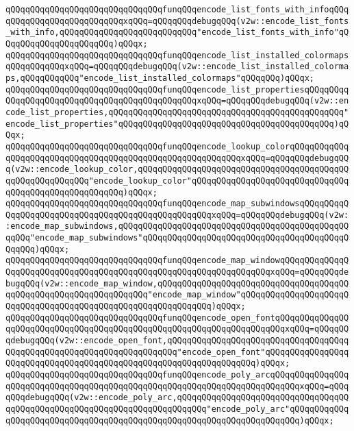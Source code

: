 \verb|qQQqqQQqqQQqqQQqqQQqqQQqqQQqqQQqfunqQQqencode_list_fonts_with_infoqQQqqQQqqQQqqQQqqQQqqQQqqQQqxqQQq=qQQqqQQqdebugqQQq(v2w::encode_list_fonts_with_info,qQQqqQQqqQQqqQQqqQQqqQQqqQQq"encode_list_fonts_with_info"qQQqqQQqqQQqqQQqqQQqqQQq)qQQqx;|\newline
\verb|qQQqqQQqqQQqqQQqqQQqqQQqqQQqqQQqfunqQQqencode_list_installed_colormapsqQQqqQQqqQQqxqQQq=qQQqqQQqdebugqQQq(v2w::encode_list_installed_colormaps,qQQqqQQqqQQq"encode_list_installed_colormaps"qQQqqQQq)qQQqx;|\newline
\verb|qQQqqQQqqQQqqQQqqQQqqQQqqQQqqQQqfunqQQqencode_list_propertiesqQQqqQQqqQQqqQQqqQQqqQQqqQQqqQQqqQQqqQQqqQQqqQQqxqQQq=qQQqqQQqdebugqQQq(v2w::encode_list_properties,qQQqqQQqqQQqqQQqqQQqqQQqqQQqqQQqqQQqqQQqqQQqqQQq"encode_list_properties"qQQqqQQqqQQqqQQqqQQqqQQqqQQqqQQqqQQqqQQqqQQq)qQQqx;|\newline
\verb|qQQqqQQqqQQqqQQqqQQqqQQqqQQqqQQqfunqQQqencode_lookup_colorqQQqqQQqqQQqqQQqqQQqqQQqqQQqqQQqqQQqqQQqqQQqqQQqqQQqqQQqqQQqxqQQq=qQQqqQQqdebugqQQq(v2w::encode_lookup_color,qQQqqQQqqQQqqQQqqQQqqQQqqQQqqQQqqQQqqQQqqQQqqQQqqQQqqQQqqQQq"encode_lookup_color"qQQqqQQqqQQqqQQqqQQqqQQqqQQqqQQqqQQqqQQqqQQqqQQqqQQqqQQq)qQQqx;|\newline
\verb|qQQqqQQqqQQqqQQqqQQqqQQqqQQqqQQqfunqQQqencode_map_subwindowsqQQqqQQqqQQqqQQqqQQqqQQqqQQqqQQqqQQqqQQqqQQqqQQqqQQqxqQQq=qQQqqQQqdebugqQQq(v2w::encode_map_subwindows,qQQqqQQqqQQqqQQqqQQqqQQqqQQqqQQqqQQqqQQqqQQqqQQqqQQq"encode_map_subwindows"qQQqqQQqqQQqqQQqqQQqqQQqqQQqqQQqqQQqqQQqqQQqqQQq)qQQqx;|\newline
\verb|qQQqqQQqqQQqqQQqqQQqqQQqqQQqqQQqfunqQQqencode_map_windowqQQqqQQqqQQqqQQqqQQqqQQqqQQqqQQqqQQqqQQqqQQqqQQqqQQqqQQqqQQqqQQqqQQqxqQQq=qQQqqQQqdebugqQQq(v2w::encode_map_window,qQQqqQQqqQQqqQQqqQQqqQQqqQQqqQQqqQQqqQQqqQQqqQQqqQQqqQQqqQQqqQQqqQQq"encode_map_window"qQQqqQQqqQQqqQQqqQQqqQQqqQQqqQQqqQQqqQQqqQQqqQQqqQQqqQQqqQQqqQQq)qQQqx;|\newline
\verb|qQQqqQQqqQQqqQQqqQQqqQQqqQQqqQQqfunqQQqencode_open_fontqQQqqQQqqQQqqQQqqQQqqQQqqQQqqQQqqQQqqQQqqQQqqQQqqQQqqQQqqQQqqQQqqQQqqQQqxqQQq=qQQqqQQqdebugqQQq(v2w::encode_open_font,qQQqqQQqqQQqqQQqqQQqqQQqqQQqqQQqqQQqqQQqqQQqqQQqqQQqqQQqqQQqqQQqqQQqqQQq"encode_open_font"qQQqqQQqqQQqqQQqqQQqqQQqqQQqqQQqqQQqqQQqqQQqqQQqqQQqqQQqqQQqqQQqqQQq)qQQqx;|\newline
\verb|qQQqqQQqqQQqqQQqqQQqqQQqqQQqqQQqfunqQQqencode_poly_arcqQQqqQQqqQQqqQQqqQQqqQQqqQQqqQQqqQQqqQQqqQQqqQQqqQQqqQQqqQQqqQQqqQQqqQQqqQQqxqQQq=qQQqqQQqdebugqQQq(v2w::encode_poly_arc,qQQqqQQqqQQqqQQqqQQqqQQqqQQqqQQqqQQqqQQqqQQqqQQqqQQqqQQqqQQqqQQqqQQqqQQqqQQq"encode_poly_arc"qQQqqQQqqQQqqQQqqQQqqQQqqQQqqQQqqQQqqQQqqQQqqQQqqQQqqQQqqQQqqQQqqQQqqQQq)qQQqx;|\newline
